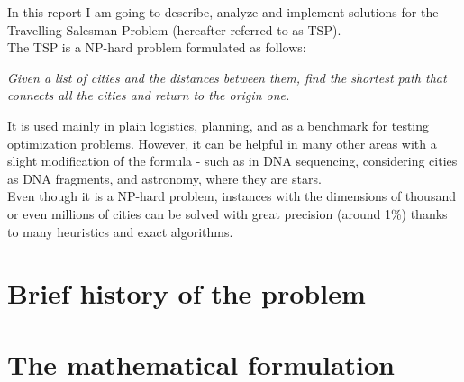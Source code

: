 In this report I am going to describe, analyze and implement solutions for the Travelling Salesman Problem (hereafter referred to as TSP).\\
The TSP is a NP-hard problem formulated as follows:
\begin{displayquote}
	\textit{Given a list of cities and the distances between them, find the shortest path that connects all the cities and return to the origin one.}
\end{displayquote}
It is used mainly in plain logistics, planning, and as a benchmark for
testing optimization problems. However, it can be helpful in many other
areas with a slight modification of the formula - such as in DNA sequencing,
considering cities as DNA fragments, and astronomy, where they are stars.\\
Even though it is a NP-hard problem, instances with the dimensions of thousand or even millions of cities can be solved  with great precision (around 1\%) thanks to many heuristics and exact algorithms.

\section{Brief history of the problem}


\section{The mathematical formulation}
\label{chapter:mat_formulation}
